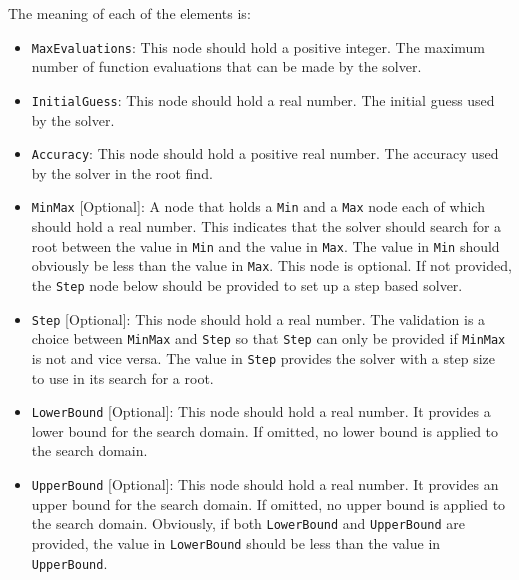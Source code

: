 \documentclass[12pt, a4paper]{article}
\begin{document}
{{The meaning of each of the elements is:
\begin{itemize}
\item \lstinline!MaxEvaluations!:
This node should hold a positive integer. The maximum number of function evaluations that can be made by the solver.

\item \lstinline!InitialGuess!:
This node should hold a real number. The initial guess used by the solver.

\item \lstinline!Accuracy!:
This node should hold a positive real number. The accuracy used by the solver in the root find.

\item \lstinline!MinMax! [Optional]:
A node that holds a \lstinline!Min! and a \lstinline!Max! node each of which should hold a real number. This indicates that the solver should search for a root between the value in \lstinline!Min! and the value in \lstinline!Max!. The value in \lstinline!Min! should obviously be less than the value in \lstinline!Max!. This node is optional. If not provided, the \lstinline!Step! node below should be provided to set up a step based solver.

\item \lstinline!Step! [Optional]:
This node should hold a real number. The validation is a choice between \lstinline!MinMax! and \lstinline!Step! so that \lstinline!Step! can only be provided if \lstinline!MinMax! is not and vice versa. The value in \lstinline!Step! provides the solver with a step size to use in its search for a root.

\item \lstinline!LowerBound! [Optional]:
This node should hold a real number. It provides a lower bound for the search domain. If omitted, no lower bound is applied to the search domain.

\item \lstinline!UpperBound! [Optional]:
This node should hold a real number. It provides an upper bound for the search domain. If omitted, no upper bound is applied to the search domain. Obviously, if both \lstinline!LowerBound! and \lstinline!UpperBound! are provided, the value in \lstinline!LowerBound! should be less than the value in \lstinline!UpperBound!.

\end{itemize}





}}
\end{document}
